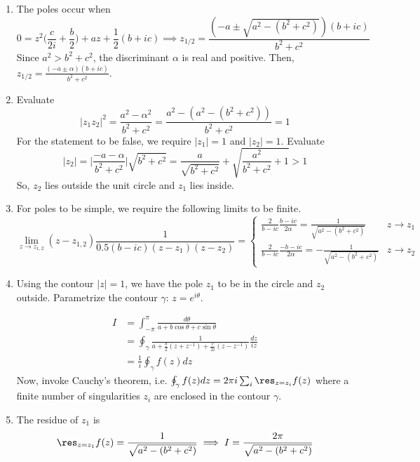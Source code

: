 \documentclass[a4paper]{article}
\begin{document}
\begin{ans}\leavevmode
\begin{enumerate}[label=(\roman*)]
\item The poles occur when 
$$0=z^2\bigg(\frac{c}{2i}+\frac{b}{2}\bigg)+az+\frac{1}{2}(b+ic)\implies z_{1/2}=\frac{(-a\pm\sqrt{a^2-(b^2+c^2)})(b+ic)}{b^2+c^2}$$
Since $a^2>b^2+c^2$, the discriminant $\alpha$ is real and positive. Then, $z_{1/2}=\frac{(-a\pm\alpha)(b+ic)}{b^2+c^2}$.
\item Evaluate
$$|z_1z_2|^2=\frac{a^2-\alpha^2}{b^2+c^2}=\frac{a^2-(a^2-(b^2+c^2))}{b^2+c^2}=1$$
For the statement to be false, we require $|z_1|=1$ and $|z_2|=1$. Evaluate
$$|z_2|=\bigg|\frac{-a-\alpha}{b^2+c^2}\bigg|\sqrt{b^2+c^2}=\frac{a}{\sqrt{b^2+c^2}}+\sqrt{\frac{a^2}{b^2+c^2}+1}>1$$
So, $z_2$ lies outside the unit circle and $z_1$ lies inside.
\item For poles to be simple, we require the following limits to be finite.
$$\lim_{z\rightarrow z_{1,2}}(z-z_{1,2})\frac{1}{0.5(b-ic)(z-z_1)(z-z_2)}=
\left\{
        \begin{array}{ll}
      \frac{2}{b-ic}\frac{b-ic}{2\alpha}=\frac{1}{\sqrt{a^2-(b^2+c^2)}}& z\rightarrow z_1 \\
      \frac{2}{b-ic}\frac{-b-ic}{2\alpha}=-\frac{1}{\sqrt{a^2-(b^2+c^2)}} & z\rightarrow z_2
        \end{array}
    \right.$$
\item Using the contour $|z|=1$, we have the pole $z_1$ to be in the circle and $z_2$ outside. Parametrize the contour $\gamma$: $z=e^{i\theta}$.
 \begin{center}
  \end{center}

\begin{align}
    I&=\int_{-\pi}^\pi\frac{d\theta}{a+b\cos\theta+c\sin\theta}\nonumber\\&=\oint_{\gamma}\frac{1}{a+\frac{b}{2}(z+z^{-1})+\frac{c}{2i}(z-z^{-1})}\frac{dz}{iz}\nonumber\\&=\frac{1}{i}\oint_\gamma f(z)dz\nonumber
\end{align}
Now, invoke Cauchy's theorem, i.e. $\oint_{\gamma}f(z)dz=2\pi i\sum_i\res_{z=z_i}f(z)$ where a finite number of singularities $z_i$ are enclosed in the contour $\gamma$.
\item The residue of $z_1$ is
$$\res_{z=z_1}f(z)=\frac{1}{\sqrt{a^2-(b^2+c^2)}}\implies I=\frac{2\pi}{\sqrt{a^2-(b^2+c^2)}}$$
\end{enumerate}
\end{ans}
\end{document}
